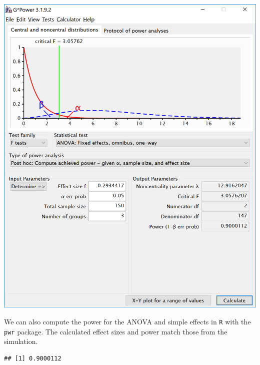 \documentclass[
]{book}
\newenvironment{Shaded}{\begin{snugshade}}{\end{snugshade}}
\newcommand{\DataTypeTok}[1]{\textcolor[rgb]{0.13,0.29,0.53}{#1}}
\newcommand{\DecValTok}[1]{\textcolor[rgb]{0.00,0.00,0.81}{#1}}
\newcommand{\FloatTok}[1]{\textcolor[rgb]{0.00,0.00,0.81}{#1}}
\newcommand{\KeywordTok}[1]{\textcolor[rgb]{0.13,0.29,0.53}{\textbf{#1}}}
\newcommand{\NormalTok}[1]{#1}
\newcommand{\OperatorTok}[1]{\textcolor[rgb]{0.81,0.36,0.00}{\textbf{#1}}}
\newcommand{\StringTok}[1]{\textcolor[rgb]{0.31,0.60,0.02}{#1}}
\begin{document}
\includegraphics{screenshots/gpower_7.png}

We can also compute the power for the ANOVA and simple effects in \texttt{R} with the \texttt{pwr} package. The calculated effect sizes and power match those from the simulation.

\begin{Shaded}
\end{Shaded}

\begin{verbatim}
## [1] 0.9000112
\end{verbatim}
\end{document}
